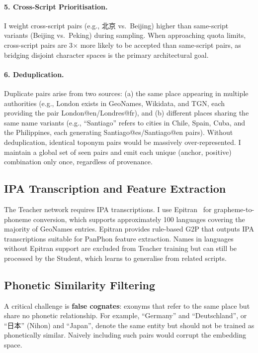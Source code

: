 \documentclass[11pt,a4paper]{article}
\newcommand{\textcn}[1]{{\chinesefont #1}}
\begin{document}
\paragraph{5. Cross-Script Prioritisation.}
I weight cross-script pairs (e.g., \textcn{北京} vs.\ Beijing) higher than same-script variants (Beijing vs.\ Peking) during sampling. When approaching quota limits, cross-script pairs are 3$\times$ more likely to be accepted than same-script pairs, as bridging disjoint character spaces is the primary architectural goal.

\paragraph{6. Deduplication.}
Duplicate pairs arise from two sources: (a) the same place appearing in multiple authorities (e.g., London exists in GeoNames, Wikidata, and TGN, each providing the pair London@en/Londres@fr), and (b) different places sharing the same name variants (e.g., ``Santiago'' refers to cities in Chile, Spain, Cuba, and the Philippines, each generating Santiago@es/Santiago@en pairs). Without deduplication, identical toponym pairs would be massively over-represented. I maintain a global set of seen pairs and emit each unique (anchor, positive) combination only once, regardless of provenance.

\subsection{IPA Transcription and Feature Extraction}

The Teacher network requires IPA transcriptions. I use Epitran~\citep{mortensen2018} for grapheme-to-phoneme conversion, which supports approximately 100 languages covering the majority of GeoNames entries. Epitran provides rule-based G2P that outputs IPA transcriptions suitable for PanPhon feature extraction. Names in languages without Epitran support are excluded from Teacher training but can still be processed by the Student, which learns to generalise from related scripts.

\subsection{Phonetic Similarity Filtering}

A critical challenge is \textbf{false cognates}: exonyms that refer to the same place but share no phonetic relationship. For example, ``Germany'' and ``Deutschland'', or ``\textcn{日本}'' (Nihon) and ``Japan'', denote the same entity but should not be trained as phonetically similar. Naively including such pairs would corrupt the embedding space.
\end{document}
